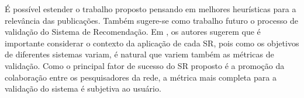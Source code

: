 \documentclass[12pt]{article}
\begin{document}
É possível estender o trabalho proposto pensando em melhores heurísticas para a relevância das publicações. Também sugere-se como trabalho futuro o processo de validação do Sistema de Recomendação. Em \cite{shani2011evaluating}, os autores sugerem que é importante considerar o contexto da aplicação de cada SR, pois como os objetivos de diferentes sistemas variam, é natural que variem também as métricas de validação. Como o principal fator de sucesso do SR  proposto é a promoção da colaboração entre os pesquisadores da rede, a métrica mais completa para a validação do sistema é subjetiva ao usuário.



\end{document}
